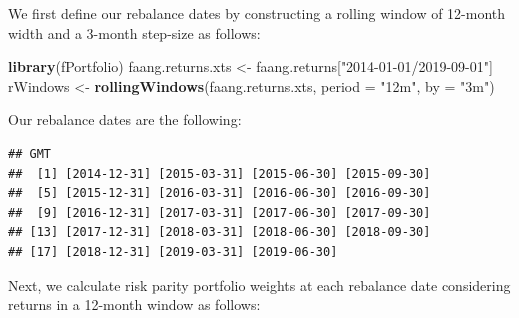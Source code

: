 \documentclass[]{book}
\newenvironment{Shaded}{\begin{snugshade}}{\end{snugshade}}
\newcommand{\KeywordTok}[1]{\textcolor[rgb]{0.13,0.29,0.53}{\textbf{#1}}}
\newcommand{\DataTypeTok}[1]{\textcolor[rgb]{0.13,0.29,0.53}{#1}}
\newcommand{\StringTok}[1]{\textcolor[rgb]{0.31,0.60,0.02}{#1}}
\newcommand{\OperatorTok}[1]{\textcolor[rgb]{0.81,0.36,0.00}{\textbf{#1}}}
\newcommand{\NormalTok}[1]{#1}
\theoremstyle{definition}
\theoremstyle{definition}
\theoremstyle{definition}
\theoremstyle{remark}
\begin{document}
We first define our rebalance dates by constructing a rolling window of
12-month width and a 3-month step-size as follows:

\begin{Shaded}
\begin{Highlighting}[]
\KeywordTok{library}\NormalTok{(fPortfolio)}
\NormalTok{faang.returns.xts <-}\StringTok{ }\NormalTok{faang.returns[}\StringTok{"2014-01-01/2019-09-01"}\NormalTok{]}
\NormalTok{rWindows <-}\StringTok{ }\KeywordTok{rollingWindows}\NormalTok{(faang.returns.xts, }\DataTypeTok{period =} \StringTok{"12m"}\NormalTok{, }
  \DataTypeTok{by =} \StringTok{"3m"}\NormalTok{)}
\end{Highlighting}
\end{Shaded}

Our rebalance dates are the following:

\begin{Shaded}
\end{Shaded}

\begin{verbatim}
## GMT
##  [1] [2014-12-31] [2015-03-31] [2015-06-30] [2015-09-30]
##  [5] [2015-12-31] [2016-03-31] [2016-06-30] [2016-09-30]
##  [9] [2016-12-31] [2017-03-31] [2017-06-30] [2017-09-30]
## [13] [2017-12-31] [2018-03-31] [2018-06-30] [2018-09-30]
## [17] [2018-12-31] [2019-03-31] [2019-06-30]
\end{verbatim}

Next, we calculate risk parity portfolio weights at each rebalance date
considering returns in a 12-month window as follows:
\end{document}
